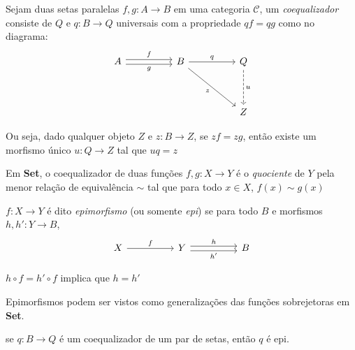 \documentclass[../main.tex]{subfiles}
\begin{document}
\begin{definition}
    Sejam duas setas paralelas $f, g : A \to B$ em uma categoria $\mathcal{C}$, um \emph{coequalizador} consiste de $Q$ e $q : B \to Q$ universais com a propriedade $qf = qg$ como no diagrama:
    \[\begin{tikzcd}
        A && B && Q \\
        \\
        &&&& Z
        \arrow["f", shift left, from=1-1, to=1-3]
        \arrow["g"', shift right, from=1-1, to=1-3]
        \arrow["q", from=1-3, to=1-5]
        \arrow["z"', from=1-3, to=3-5]
        \arrow["u", dashed, from=1-5, to=3-5]
    \end{tikzcd}\]

    Ou seja, dado qualquer objeto $Z$ e $z : B \to Z$, se $zf = zg$, então existe um morfismo único $u : Q \to Z$ tal que $uq = z$
\end{definition}

Em \textbf{Set}, o coequalizador de duas funções $f, g : X \to Y$ é o \emph{quociente} de $Y$ pela menor relação de equivalência $\sim$ tal que para todo $x \in X$, $f(x) \sim g(x)$

\begin{definition}
    $f: X \to Y$ é dito \emph{epimorfismo} (ou somente \emph{epi}) se para todo $B$ e morfismos $h, h' : Y \to B$,
    \[\begin{tikzcd}
        X && Y && B
        \arrow["f", from=1-1, to=1-3]
        \arrow["h", shift left, from=1-3, to=1-5]
        \arrow["{h'}"', shift right, from=1-3, to=1-5]
    \end{tikzcd}\]

    $h \circ f = h' \circ f$ implica que $h = h'$
\end{definition}

Epimorfismos podem ser vistos como generalizações das funções sobrejetoras em \textbf{Set}.

\begin{proposition}
    se $q : B \to Q$ é um coequalizador de um par de setas, então $q$ é epi.
\end{proposition}
\end{document}
